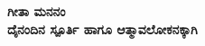 \begin{titlepage}
    \begin{center}
        \vspace*{0.5cm}
            
        {\Huge
        \textbf{\color{white}\fontsize{50}{60}\selectfont ಗೀತಾ ಮನನಂ}}
        \textbf{\\ \small \color{white}ದೈನಂದಿನ ಸ್ಪೂರ್ತಿ ಹಾಗೂ ಆತ್ಮಾವಲೋಕನಕ್ಕಾಗಿ}    
        \vspace{1.0cm}
            

\end{center}
\end{titlepage}
